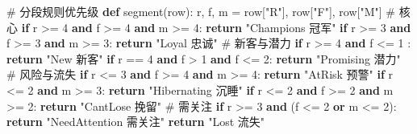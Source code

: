 \documentclass[
]{ctexart}
\newenvironment{Shaded}{\begin{snugshade}}{\end{snugshade}}
\newcommand{\CommentTok}[1]{\textcolor[rgb]{0.37,0.37,0.37}{#1}}
\newcommand{\ControlFlowTok}[1]{\textcolor[rgb]{0.00,0.23,0.31}{\textbf{#1}}}
\newcommand{\DecValTok}[1]{\textcolor[rgb]{0.68,0.00,0.00}{#1}}
\newcommand{\KeywordTok}[1]{\textcolor[rgb]{0.00,0.23,0.31}{\textbf{#1}}}
\newcommand{\NormalTok}[1]{\textcolor[rgb]{0.00,0.23,0.31}{#1}}
\newcommand{\OperatorTok}[1]{\textcolor[rgb]{0.37,0.37,0.37}{#1}}
\newcommand{\StringTok}[1]{\textcolor[rgb]{0.13,0.47,0.30}{#1}}
\begin{document}
\begin{Shaded}
\begin{Highlighting}[]


\CommentTok{\# 分段规则优先级}
\KeywordTok{def}\NormalTok{ segment(row):}
\NormalTok{    r, f, m }\OperatorTok{=}\NormalTok{ row[}\StringTok{"R"}\NormalTok{], row[}\StringTok{"F"}\NormalTok{], row[}\StringTok{"M"}\NormalTok{]}
    \CommentTok{\# 核心}
    \ControlFlowTok{if}\NormalTok{ r }\OperatorTok{\textgreater{}=} \DecValTok{4} \KeywordTok{and}\NormalTok{ f }\OperatorTok{\textgreater{}=} \DecValTok{4} \KeywordTok{and}\NormalTok{ m }\OperatorTok{\textgreater{}=} \DecValTok{4}\NormalTok{:}
        \ControlFlowTok{return} \StringTok{"Champions 冠军"}
    \ControlFlowTok{if}\NormalTok{ r }\OperatorTok{\textgreater{}=} \DecValTok{3} \KeywordTok{and}\NormalTok{ f }\OperatorTok{\textgreater{}=} \DecValTok{3} \KeywordTok{and}\NormalTok{ m }\OperatorTok{\textgreater{}=} \DecValTok{3}\NormalTok{:}
        \ControlFlowTok{return} \StringTok{"Loyal 忠诚"}
    \CommentTok{\# 新客与潜力}
    \ControlFlowTok{if}\NormalTok{ r }\OperatorTok{\textgreater{}=} \DecValTok{4} \KeywordTok{and}\NormalTok{ f }\OperatorTok{\textless{}=} \DecValTok{1}\NormalTok{ :}
        \ControlFlowTok{return} \StringTok{"New 新客"}
    \ControlFlowTok{if}\NormalTok{ r }\OperatorTok{==} \DecValTok{4} \KeywordTok{and}\NormalTok{ f }\OperatorTok{\textgreater{}} \DecValTok{1} \KeywordTok{and}\NormalTok{ f }\OperatorTok{\textless{}=} \DecValTok{2}\NormalTok{:}
        \ControlFlowTok{return} \StringTok{"Promising 潜力"}
    \CommentTok{\# 风险与流失}
    \ControlFlowTok{if}\NormalTok{ r }\OperatorTok{\textless{}=} \DecValTok{3} \KeywordTok{and}\NormalTok{ f }\OperatorTok{\textgreater{}=} \DecValTok{4} \KeywordTok{and}\NormalTok{ m }\OperatorTok{\textgreater{}=} \DecValTok{4}\NormalTok{:}
        \ControlFlowTok{return} \StringTok{"AtRisk 预警"}
    \ControlFlowTok{if}\NormalTok{ r }\OperatorTok{\textless{}=} \DecValTok{2} \KeywordTok{and}\NormalTok{ m }\OperatorTok{\textgreater{}=} \DecValTok{3}\NormalTok{:}
        \ControlFlowTok{return} \StringTok{"Hibernating 沉睡"}
    \ControlFlowTok{if}\NormalTok{ r }\OperatorTok{\textless{}=} \DecValTok{2} \KeywordTok{and}\NormalTok{ f }\OperatorTok{\textgreater{}=} \DecValTok{2} \KeywordTok{and}\NormalTok{ m }\OperatorTok{\textgreater{}=} \DecValTok{2}\NormalTok{:}
        \ControlFlowTok{return} \StringTok{"CantLose 挽留"}
    \CommentTok{\# 需关注}
    \ControlFlowTok{if}\NormalTok{ r }\OperatorTok{\textgreater{}=} \DecValTok{3} \KeywordTok{and}\NormalTok{ (f }\OperatorTok{\textless{}=} \DecValTok{2} \KeywordTok{or}\NormalTok{ m }\OperatorTok{\textless{}=} \DecValTok{2}\NormalTok{):}
        \ControlFlowTok{return} \StringTok{"NeedAttention 需关注"}
    \ControlFlowTok{return} \StringTok{"Lost 流失"}


\end{Highlighting}
\end{Shaded}
\end{document}

